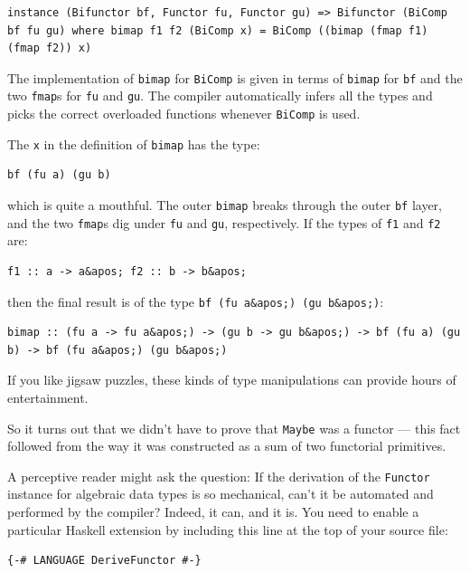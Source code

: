 \begin{verbatim}
instance (Bifunctor bf, Functor fu, Functor gu) => Bifunctor (BiComp bf fu gu) where bimap f1 f2 (BiComp x) = BiComp ((bimap (fmap f1) (fmap f2)) x) 
\end{verbatim}

The implementation of \texttt{bimap} for \texttt{BiComp} is given in
terms of \texttt{bimap} for \texttt{bf} and the two \texttt{fmap}s for
\texttt{fu} and \texttt{gu}. The compiler automatically infers all the
types and picks the correct overloaded functions whenever
\texttt{BiComp} is used.

The \texttt{x} in the definition of \texttt{bimap} has the type:

\begin{verbatim}
bf (fu a) (gu b)
\end{verbatim}

which is quite a mouthful. The outer \texttt{bimap} breaks through the
outer \texttt{bf} layer, and the two \texttt{fmap}s dig under
\texttt{fu} and \texttt{gu}, respectively. If the types of \texttt{f1}
and \texttt{f2} are:

\begin{verbatim}
f1 :: a -> a&apos; f2 :: b -> b&apos;
\end{verbatim}

then the final result is of the type
\texttt{bf\ (fu\ a\&apos;)\ (gu\ b\&apos;)}:

\begin{verbatim}
bimap :: (fu a -> fu a&apos;) -> (gu b -> gu b&apos;) -> bf (fu a) (gu b) -> bf (fu a&apos;) (gu b&apos;)
\end{verbatim}

If you like jigsaw puzzles, these kinds of type manipulations can
provide hours of entertainment.

So it turns out that we didn't have to prove that \texttt{Maybe} was a
functor --- this fact followed from the way it was constructed as a sum
of two functorial primitives.

A perceptive reader might ask the question: If the derivation of the
\texttt{Functor} instance for algebraic data types is so mechanical,
can't it be automated and performed by the compiler? Indeed, it can, and
it is. You need to enable a particular Haskell extension by including
this line at the top of your source file:

\begin{verbatim}
{-# LANGUAGE DeriveFunctor #-}
\end{verbatim}

